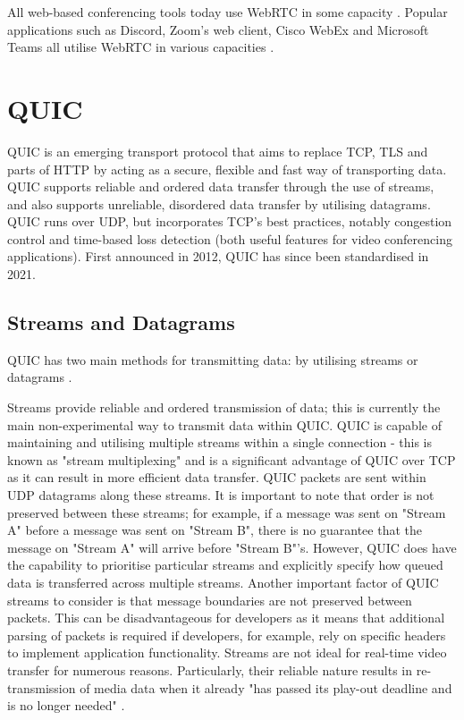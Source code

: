 All web-based conferencing tools today use WebRTC in some capacity \cite{gross_2020}. Popular applications such as Discord, Zoom's web client, Cisco WebEx and Microsoft Teams all utilise WebRTC in various capacities \cite{discord} \cite{webrtc_mozilla_blog}.

\section{QUIC}

QUIC is an emerging transport protocol that aims to replace TCP, TLS and parts of HTTP by acting as a secure, flexible and fast way of transporting data. QUIC supports reliable and ordered data transfer through the use of streams, and also supports unreliable, disordered data transfer by utilising datagrams. QUIC runs over UDP, but incorporates TCP's best practices, notably congestion control and time-based loss detection \cite{iyengar} (both useful features for video conferencing applications). First announced in 2012, QUIC has since been standardised in 2021.

\subsection{Streams and Datagrams}

QUIC has two main methods for transmitting data: by utilising streams \cite{rfc9000} or datagrams \cite{quic-datagrams-draft}. 

Streams provide reliable and ordered transmission of data; this is currently the main non-experimental way to transmit data within QUIC. QUIC is capable of maintaining and utilising multiple streams within a single connection - this is known as "stream multiplexing" and is a significant advantage of QUIC over TCP as it can result in more efficient data transfer. QUIC packets are sent within UDP datagrams along these streams. It is important to note that order is not preserved between these streams; for example, if a message was sent on "Stream A" before a message was sent on "Stream B", there is no guarantee that the message on "Stream A" will arrive before "Stream B"'s. However, QUIC does have the capability to prioritise particular streams and explicitly specify how queued data is transferred across multiple streams. Another important factor of QUIC streams to consider is that message boundaries are not preserved between packets. This can be disadvantageous for developers as it means that additional parsing of packets is required if developers, for example, rely on specific headers to implement application functionality. 
Streams are not ideal for real-time video transfer for numerous reasons. Particularly, their reliable nature results in re-transmission of media data when it already "has passed its play-out deadline and is no longer needed" \cite{perkins2018}. 

